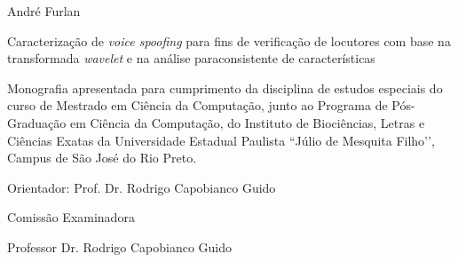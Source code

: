 \documentclass[a4paper,12pt,openright,oneside]{book}
\begin{document}

	\begin{center}

		\vspace{4cm}

		\fontsize{14}{\baselineskip} \selectfont

		\vspace{30.0pt}

		{André Furlan} \\ \vspace{30.0pt}

		{Caracterização de \textit{voice spoofing} para fins de verificação de locutores com base na transformada \textit{wavelet} e na análise paraconsistente de características} \\ \onehalfspacing \fontsize{14}{\baselineskip} \selectfont

		\par \null

		\begin{flushright}

		\parbox{3.50in}{

			\fontsize{12}{\baselineskip} \selectfont \onehalfspacing

			Monografia apresentada para cumprimento da disciplina de estudos especiais do curso de Mestrado em Ciência da Computação, junto ao Programa de Pós-Graduação em Ciência da Computação, do Instituto de Biociências, Letras e Ciências Exatas da Universidade Estadual Paulista ``Júlio de Mesquita Filho’’, Campus de São José do Rio Preto. \\ \vspace{1.0pt}

			{Orientador: Prof. Dr. Rodrigo Capobianco Guido } \\ \vspace{1.0pt}

		}

		\end{flushright}

		\fontsize{14}{\baselineskip} \selectfont

		Comissão Examinadora \\  \vspace{1.0pt}

	\end{center}




	\fontsize{14}{\baselineskip} \selectfont

	Professor Dr. Rodrigo Capobianco Guido \\ 
\end{document}
